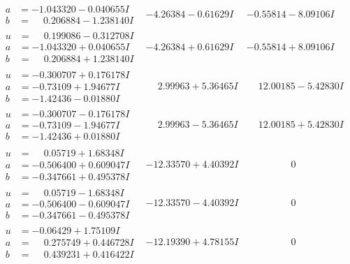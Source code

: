 \documentclass[1p]{elsarticle_modified}
\theoremstyle{definition}
\begin{document}
$$\begin{array}{c|c|c}
\begin{aligned}
a &= -1.043320 - 0.040655 I \\
b &= \phantom{-}0.206884 - 1.238140 I\end{aligned}
 & -4.26384 - 0.61629 I & -0.55814 - 8.09106 I \\ \hline\begin{aligned}
u &= \phantom{-}0.199086 - 0.312708 I \\
a &= -1.043320 + 0.040655 I \\
b &= \phantom{-}0.206884 + 1.238140 I\end{aligned}
 & -4.26384 + 0.61629 I & -0.55814 + 8.09106 I \\ \hline\begin{aligned}
u &= -0.300707 + 0.176178 I \\
a &= -0.73109 + 1.94677 I \\
b &= -1.42436 - 0.01880 I\end{aligned}
 & \phantom{-}2.99963 + 5.36465 I & \phantom{-}12.00185 - 5.42830 I \\ \hline\begin{aligned}
u &= -0.300707 - 0.176178 I \\
a &= -0.73109 - 1.94677 I \\
b &= -1.42436 + 0.01880 I\end{aligned}
 & \phantom{-}2.99963 - 5.36465 I & \phantom{-}12.00185 + 5.42830 I \\ \hline\begin{aligned}
u &= \phantom{-}0.05719 + 1.68348 I \\
a &= -0.506400 + 0.609047 I \\
b &= -0.347661 + 0.495378 I\end{aligned}
 & -12.33570 + 4.40392 I & \phantom{-0.000000 } 0 \\ \hline\begin{aligned}
u &= \phantom{-}0.05719 - 1.68348 I \\
a &= -0.506400 - 0.609047 I \\
b &= -0.347661 - 0.495378 I\end{aligned}
 & -12.33570 - 4.40392 I & \phantom{-0.000000 } 0 \\ \hline\begin{aligned}
u &= -0.06429 + 1.75109 I \\
a &= \phantom{-}0.275749 + 0.446728 I \\
b &= \phantom{-}0.439231 + 0.416422 I\end{aligned}
 & -12.19390 + 4.78155 I & \phantom{-0.000000 } 0 \\ \hline\begin{aligned}

\end{aligned}
\end{array}$$
\end{document}
